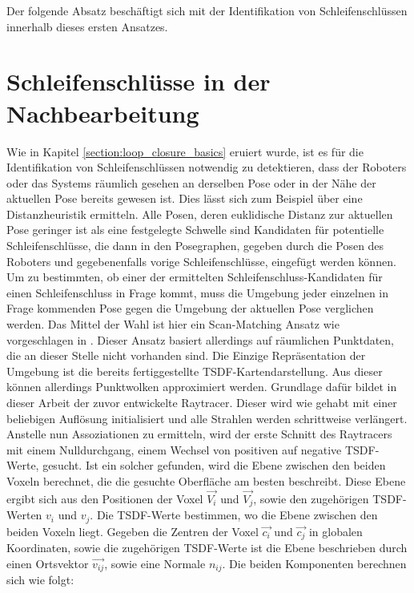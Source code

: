 Der folgende Absatz beschäftigt sich mit der Identifikation von Schleifenschlüssen innerhalb dieses ersten Ansatzes.


\section{Schleifenschlüsse in der Nachbearbeitung}
\label{section:ass_lc}

Wie in Kapitel \ref{section:loop_closure_basics} eruiert wurde, ist es für die Identifikation von Schleifenschlüssen notwendig zu detektieren, dass der Roboters oder das Systems räumlich gesehen an derselben Pose oder in der Nähe der aktuellen Pose bereits gewesen ist. Dies lässt sich zum Beispiel über eine Distanzheuristik ermitteln. Alle Posen, deren euklidische Distanz zur aktuellen Pose geringer ist als eine festgelegte Schwelle sind Kandidaten für potentielle Schleifenschlüsse, die dann in den Posegraphen, gegeben durch die Posen des Roboters und gegebenenfalls vorige Schleifenschlüsse, eingefügt werden können. Um zu bestimmten, ob einer der ermittelten Schleifenschluss-Kandidaten für einen Schleifenschluss in Frage kommt, muss die Umgebung jeder einzelnen in Frage kommenden Pose gegen die Umgebung der aktuellen Pose verglichen werden. Das Mittel der Wahl ist hier ein Scan-Matching Ansatz wie vorgeschlagen in \cite{lu1997globally,shan2020lio,borrmann2008globally}. Dieser Ansatz basiert allerdings auf räumlichen Punktdaten, die an dieser Stelle nicht vorhanden sind. Die Einzige Repräsentation der Umgebung ist die bereits fertiggestellte TSDF-Kartendarstellung. Aus dieser können allerdings Punktwolken approximiert werden. Grundlage dafür bildet in dieser Arbeit der zuvor entwickelte Raytracer. Dieser wird wie gehabt mit einer beliebigen Auflösung initialisiert und alle Strahlen werden schrittweise verlängert. Anstelle nun Assoziationen zu ermitteln, wird der erste Schnitt des Raytracers mit einem Nulldurchgang, einem Wechsel von positiven auf negative TSDF-Werte, gesucht. Ist ein solcher gefunden, wird die Ebene zwischen den beiden Voxeln berechnet, die die gesuchte Oberfläche am besten beschreibt. Diese Ebene ergibt sich aus den Positionen der Voxel $\vec{V_i}$ und $\vec{V_j}$, sowie den zugehörigen TSDF-Werten $v_i$ und $v_j$. Die TSDF-Werte bestimmen, wo die Ebene zwischen den beiden Voxeln liegt. Gegeben die Zentren der Voxel $\vec{c_i}$ und $\vec{c_j}$ in globalen Koordinaten, sowie die zugehörigen TSDF-Werte ist die Ebene beschrieben durch einen Ortsvektor $\vec{v_{ij}}$, sowie eine Normale $n_{ij}$. Die beiden Komponenten berechnen sich wie folgt:

